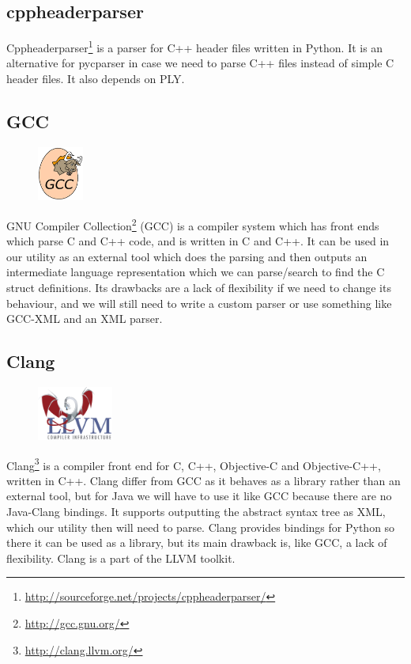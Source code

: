 \subsection{cppheaderparser}
Cppheaderparser\footnote{\url{http://sourceforge.net/projects/cppheaderparser/}}
is a parser for C++ header files written in Python. It is an alternative for
pycparser in case we need to parse C++ files instead of simple C header files.
It also depends on PLY.

\subsection{GCC}
\label{sec:pre:gcc}
\begin{figure}
	\vspace{-20pt}
	\includegraphics[width=1.5cm]{./planning/img/gcc_logo}
	\vspace{-20pt}
\end{figure}
GNU Compiler Collection\footnote{\url{http://gcc.gnu.org/}} (GCC) is a
compiler system which has front ends which parse C and C++ code, and is written
in C and C++. It can be used in our utility as an external tool which does the
parsing and then outputs an intermediate language representation which we can
parse/search to find the C struct definitions. Its drawbacks are a lack of
flexibility if we need to change its behaviour, and we will still need to write
a custom parser or use something like GCC-XML and an XML parser.

\subsection{Clang}
\label{sec:pre:clang}
\begin{figure}
	\vspace{-20pt}
	\includegraphics[width=2.5cm]{./planning/img/llvm_logo}
	\vspace{-20pt}
\end{figure}
Clang\footnote{\url{http://clang.llvm.org/}} is a compiler front end for C, 
C++, Objective-C and Objective-C++, written in C++. Clang differ from GCC as it
behaves as a library rather than an external tool, but for Java we will have to
use it like GCC because there are no Java-Clang bindings. It supports
outputting the abstract syntax tree as XML, which our utility then will need to
parse. Clang provides bindings for Python so there it can be used as a library,
but its main drawback is, like GCC, a lack of flexibility. Clang is a part of
the LLVM toolkit.


